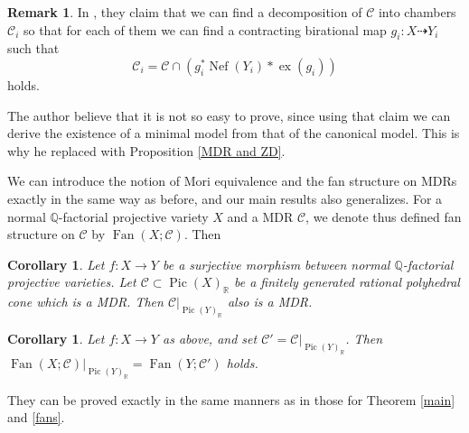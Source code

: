 \documentclass[12pt,twoside]{amsart}
\newtheorem{cor}[theo]{Corollary}
\theoremstyle{definition}
\newtheorem{rem}[theo]{Remark}
\newcommand\Nef{\mathop{\mathrm{Nef}}\nolimits}
\newcommand\Pic{\mathop{\mathrm{Pic}}\nolimits}
\newcommand\ex{\mathop{\mathrm{ex}}}
\newcommand\Fan{\mathop{\mathrm{Fan}}}
\newcommand\bq{\mathbb{Q}}
\newcommand\br{\mathbb{R}}
\begin{document}
\begin{rem}
In \cite[Theorem 2.13]{hk}, they claim that we can find a decomposition of $\mathcal{C}$ into
chambers $\mathcal{C}_i$ so that for each of them
we can find a contracting birational map
$g_i:X\dasharrow Y_i$ such that
\begin{equation*}
\mathcal{C}_i=\mathcal{C}\cap\left(g_i^{*}\Nef{(Y_i)}*\ex{(g_i)}\right)
\end{equation*}
holds.

The author believe that it is not so easy to prove, since using that claim we can derive
the existence of a minimal model from that of the canonical model.
This is why he replaced \cite[Theorem 2.13]{hk} with Proposition \ref{MDR and ZD}.

\end{rem}

We can introduce the notion of Mori equivalence and the fan structure on MDRs
exactly in the same way as before, and
our main results also generalizes. For a normal $\bq$-factorial projective variety $X$ and
a MDR $\mathcal{C}$, we denote thus defined fan structure on $\mathcal{C}$ by $\Fan{(X;\mathcal{C})}$.
Then
\begin{cor}\label{main''}
Let $f:X\to Y$ be a surjective morphism between normal $\bq$-factorial projective varieties.
Let $\mathcal{C}\subset \Pic{(X)}_{\br}$
be a finitely generated rational polyhedral cone which is a MDR. Then
$\mathcal{C}|_{\Pic{(Y)}_{\br}}$ also is a MDR.
\end{cor}
\begin{cor}\label{fans''}
Let $f:X\to Y$ as above, and set $\mathcal{C}'=\mathcal{C}|_{\Pic{(Y)}_{\br}}$. Then
$\Fan{(X;\mathcal{C})}|_{\Pic{(Y)}_{\br}}=\Fan{(Y;\mathcal{C}')}$ holds.
\end{cor}
They can be proved exactly in the same manners as in those for Theorem \ref{main} and \ref{fans}.
\end{document}
